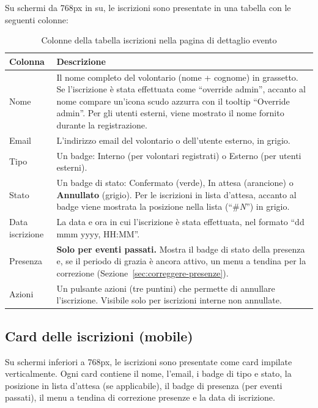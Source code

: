 \documentclass[a4paper,11pt,oneside]{book}
\begin{document}
Su schermi da 768px in su, le iscrizioni sono presentate in una tabella con le seguenti colonne:

\begin{table}[htbp]
\centering
\caption{Colonne della tabella iscrizioni nella pagina di dettaglio evento}
\label{tab:colonne-iscrizioni}
\begin{tabularx}{\textwidth}{l X}
\toprule
\textbf{Colonna} & \textbf{Descrizione} \\
\midrule
Nome          & Il nome completo del volontario (nome + cognome) in grassetto. Se l'iscrizione \`e stata effettuata come ``override admin'', accanto al nome compare un'icona scudo \textcolor{namoCyan}{azzurra} con il tooltip ``Override admin''. Per gli utenti esterni, viene mostrato il nome fornito durante la registrazione. \\
Email         & L'indirizzo email del volontario o dell'utente esterno, in grigio. \\
Tipo          & Un badge: \textcolor{namoCyan}{Interno} (per volontari registrati) o \textcolor{namoOrange}{Esterno} (per utenti esterni). \\
Stato         & Un badge di stato: \textcolor{namoGreen}{Confermato} (verde), \textcolor{namoOrange}{In attesa} (arancione) o \textbf{Annullato} (grigio). Per le iscrizioni in lista d'attesa, accanto al badge viene mostrata la posizione nella lista (``\#\textit{N}'') in grigio. \\
Data iscrizione & La data e ora in cui l'iscrizione \`e stata effettuata, nel formato ``dd mmm yyyy, HH:MM''. \\
Presenza      & \textbf{Solo per eventi passati.} Mostra il badge di stato della presenza e, se il periodo di grazia \`e ancora attivo, un menu a tendina per la correzione (Sezione~\ref{sec:correggere-presenze}). \\
Azioni        & Un pulsante azioni (tre puntini) che permette di annullare l'iscrizione. Visibile solo per iscrizioni interne non annullate. \\
\bottomrule
\end{tabularx}
\end{table}

\subsection{Card delle iscrizioni (mobile)}

Su schermi inferiori a 768px, le iscrizioni sono presentate come card impilate verticalmente. Ogni card contiene il nome, l'email, i badge di tipo e stato, la posizione in lista d'attesa (se applicabile), il badge di presenza (per eventi passati), il menu a tendina di correzione presenze e la data di iscrizione.
\end{document}
